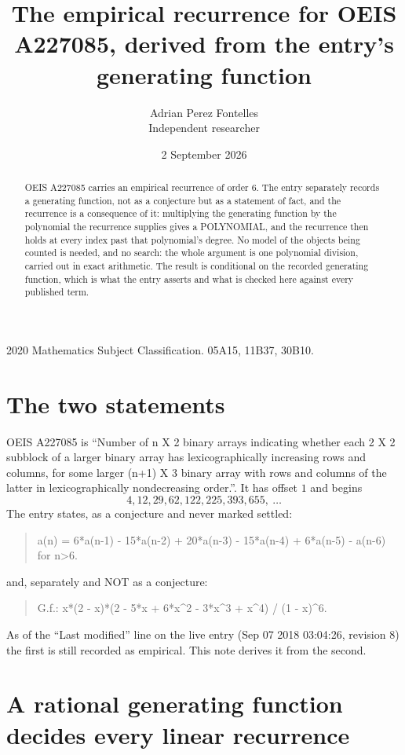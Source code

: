 \documentclass[11pt,a4paper]{article}
\title{The empirical recurrence for OEIS A227085, derived from the entry's generating function}
\author{Adrian Perez Fontelles\\ \small Independent researcher}
\date{2 September 2026}
\theoremstyle{plain}
\theoremstyle{definition}
\begin{document}
\maketitle

\begin{abstract}
OEIS A227085 carries an empirical recurrence of order $6$. The entry separately records a
generating function, not as a conjecture but as a statement of fact, and the recurrence is a
consequence of it: multiplying the generating function by the polynomial the recurrence
supplies gives a POLYNOMIAL, and the recurrence then holds at every index past that
polynomial's degree. No model of the objects being counted is needed, and no search: the
whole argument is one polynomial division, carried out in exact arithmetic. The result is
conditional on the recorded generating function, which is what the entry asserts and what is
checked here against every published term.
\end{abstract}

\noindent\small 2020 Mathematics Subject Classification. 05A15, 11B37, 30B10.\normalsize

\section{The two statements}

OEIS A227085 is ``Number of n X 2 binary arrays indicating whether each 2 X 2 subblock of a larger binary array has lexicographically increasing rows and columns, for some larger (n+1) X 3 binary array with rows and columns of the latter in lexicographically nondecreasing order.''. It has offset $1$ and begins
\[
4, 12, 29, 62, 122, 225, 393, 655,\ \dots
\]
The entry states, as a conjecture and never marked settled:
\begin{quote}
a(n) = 6*a(n-1) - 15*a(n-2) + 20*a(n-3) - 15*a(n-4) + 6*a(n-5) - a(n-6) for n>6.
\end{quote}
and, separately and NOT as a conjecture:
\begin{quote}
G.f.: x*(2 - x)*(2 - 5*x + 6*x\^{}2 - 3*x\^{}3 + x\^{}4) / (1 - x)\^{}6.
\end{quote}
As of the ``Last modified'' line on the live entry (Sep 07 2018 03:04:26, revision 8) the first is still
recorded as empirical. This note derives it from the second.

\section{A rational generating function decides every linear recurrence}
\end{document}
